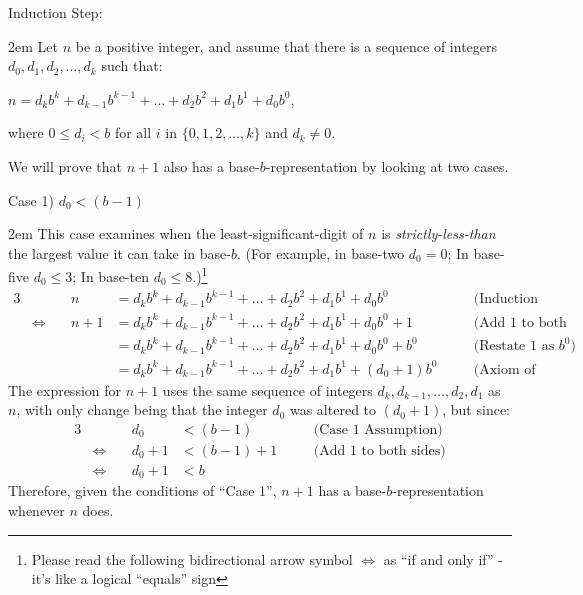 \documentclass{article}
\newenvironment{jprIn}{\begin{adjustwidth}{2em}{}}{\end{adjustwidth}}
\begin{document}
\bigskip
Induction Step:
\begin{jprIn}
Let $n$ be a positive integer, and assume that
there is a sequence
of integers $d_0, d_1, d_2,\dots{},d_k$ such that:

\hspace{3em}$n=d_kb^k+d_{k-1}b^{k-1}+\dots+d_2b^2+d_1b^1+d_0b^0$,

where $0\le{}d_i<b$ for all $i$ in $\{0,1,2,\dots{},k\}$ and $d_k\ne0$.

We will prove that $n+1$ also has a
base-$b$-representation by looking at two cases.

\break
Case 1) $d_0<(b-1)$
\begin{jprIn}
This case examines when the least-significant-digit
of $n$ is \emph{strictly-less-than} the largest value it can take in base-$b$.
(For example, in base-two $d_0 = 0$;
In base-five $d_0\le{}3$;
In base-ten $d_0\le{}8$.)\footnote{Please read the following
bidirectional arrow symbol $\Leftrightarrow$
as ``if and only if'' - it's like a logical ``equals'' sign}
{\small
\begin{alignat*}{3}
  &&n
  &= d_kb^k+d_{k-1}b^{k-1}+\dots+d_2b^2+d_1b^1+d_0b^0 &&\quad\text{(Induction Assumption)}\\
  &\Leftrightarrow\quad
  &n+1
  &= d_kb^k+d_{k-1}b^{k-1}+\dots+d_2b^2+d_1b^1+d_0b^0 + 1 &&\quad\text{(Add 1 to both sides)}\\  
  &&&= d_kb^k+d_{k-1}b^{k-1}+\dots+d_2b^2+d_1b^1+d_0b^0 + b^0 &&\quad\text{(Restate 1 as }b^0\text{)}\\
  &&&= d_kb^k+d_{k-1}b^{k-1}+\dots+d_2b^2+d_1b^1 + (d_0+1)b^0 &&\quad\text{(Axiom of Distribution)}
\end{alignat*}
}The expression for $n+1$ uses the same sequence of
integers $d_k, d_{k-1},\dots{},d_2,d_1$ as $n$, with only
change being that the integer $d_0$ was altered to $(d_0{+}1)$, but since:
\begin{alignat*}{3}
  &&d_0
  &< (b-1) &&\quad\text{(Case 1 Assumption)}\\
  &\Leftrightarrow\quad
  &d_0+1
  &< (b-1)+1 &&\quad\text{(Add 1 to both sides)}\\  
  &\Leftrightarrow\quad
  &d_0+1
  &< b
\end{alignat*}
Therefore, given the conditions of ``Case 1'', $n+1$ has a base-$b$-representation whenever $n$ does.
\end{jprIn}


\end{jprIn}
\end{document}
